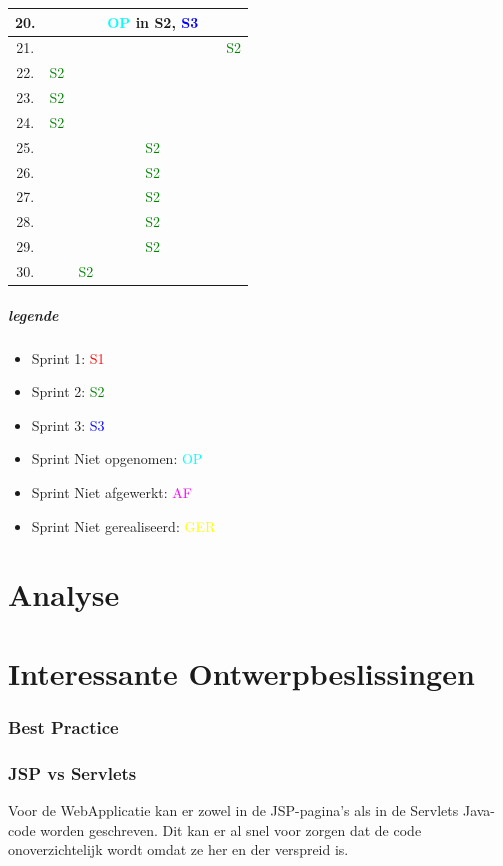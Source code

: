 \documentclass[pdftex,a4paper,12pt,twoside]{report}
\begin{document}
\begin{tabular}{|c|c|c|c|c|c|}
\hline 20.  &  &  & \textcolor{cyan}{OP} in S2, \textcolor{blue}{S3} &  &  \\
\hline 21. &  &  &  &  & \textcolor{green}{S2}   \\ 
\hline 22. & \textcolor{green}{S2}  &  &  &  &  \\
\hline 23.  & \textcolor{green}{S2} &  &  &  &  \\
\hline 24.  & \textcolor{green}{S2} &  &  &  &  \\
\hline 25.  &  &  & \textcolor{green}{S2}  &  &  \\
\hline 26.  &  &  & \textcolor{green}{S2}  &  &  \\
\hline 27.  &  &  & \textcolor{green}{S2}  &  &  \\
\hline 28.  &  &  & \textcolor{green}{S2} &  &  \\
\hline 29.  &  &  & \textcolor{green}{S2} &  &  \\
\hline 30.  &  &\textcolor{green}{S2}  &  &  &  \\
\hline 
\end{tabular} 

\paragraph{legende}
\begin{itemize}
\item Sprint 1: \textcolor{red}{S1}
\item Sprint 2: \textcolor{green}{S2}
\item Sprint 3: \textcolor{blue}{S3}
\item Sprint Niet opgenomen: \textcolor{cyan}{OP}
\item Sprint Niet afgewerkt: \textcolor{magenta}{AF}
\item Sprint Niet gerealiseerd: \textcolor{yellow}{GER}
\end{itemize}

\chapter{Analyse}

\chapter{Interessante Ontwerpbeslissingen}
\subsection{Best Practice}
\subsection{JSP vs Servlets}
Voor de WebApplicatie kan er zowel in de JSP-pagina's als in de Servlets Java-code worden geschreven. Dit kan er al snel voor zorgen dat de code onoverzichtelijk wordt omdat ze her en der verspreid is.
\end{document}

